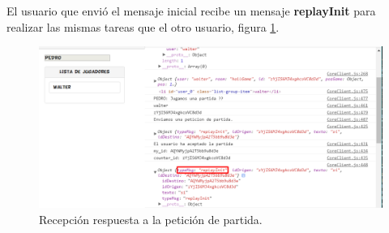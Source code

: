 El usuario que envió el mensaje inicial recibe un mensaje \textbf{replayInit} para realizar las mismas tareas que el otro usuario, figura \ref{fig:Cliente1_Response_PetiGame}.
\begin{figure}[!h]
\begin{center}
   \includegraphics[width=0.8\linewidth]{Figures/Cliente1_Response_PetiGame}
	\decoRule
	\caption[Recepción respuesta a la petición de partida.]{Recepción respuesta a la petición de partida.}
\label{fig:Cliente1_Response_PetiGame}
\end{center}
\end{figure}
